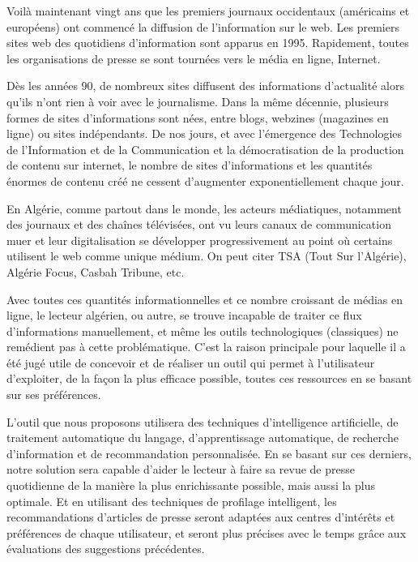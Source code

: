 
Voilà maintenant vingt ans que les premiers journaux occidentaux (américains et européens) ont commencé la diffusion de l'information sur le web. Les premiers sites web des quotidiens d'information sont apparus en 1995. Rapidement, toutes les organisations de presse se sont tournées vers le média en ligne, Internet.

Dès les années 90, de nombreux sites diffusent des informations d'actualité alors qu'ils n'ont rien à voir avec le journalisme. Dans la même décennie, plusieurs formes de sites d'informations sont nées, entre blogs, webzines (magazines en ligne) ou sites indépendants. De nos jours, et avec l'émergence des Technologies de l'Information et de la Communication et la démocratisation de la production de contenu sur internet, le nombre de sites d'informations et les quantités énormes de contenu créé ne cessent d'augmenter exponentiellement chaque jour.

En Algérie, comme partout dans le monde, les acteurs médiatiques, notamment des journaux et des chaînes télévisées, ont vu leurs canaux de communication muer et leur digitalisation se développer progressivement au point où certains utilisent le web comme unique médium. On peut citer TSA (Tout Sur l'Algérie), Algérie Focus, Casbah Tribune, etc.

Avec toutes ces quantités informationnelles et ce nombre croissant de médias en ligne, le lecteur algérien, ou autre, se trouve incapable de traiter ce flux d'informations manuellement, et même les outils technologiques (classiques) ne remédient pas à cette problématique. C'est la raison principale pour laquelle il a été jugé utile de concevoir et de réaliser un outil qui permet à l'utilisateur d'exploiter, de la façon la plus efficace possible, toutes ces ressources en se basant sur ses préférences.

L'outil que nous proposons utilisera des techniques d'intelligence artificielle, de traitement automatique du langage, d'apprentissage automatique, de recherche d'information et de recommandation personnalisée. En se basant sur ces derniers, notre solution sera capable d'aider le lecteur à faire sa revue de presse quotidienne de la manière la plus enrichissante possible, mais aussi la plus optimale. Et en utilisant des techniques de profilage intelligent, les recommandations d'articles de presse seront adaptées aux centres d'intérêts et préférences de chaque utilisateur, et seront plus précises avec le temps grâce aux évaluations des suggestions précédentes.

